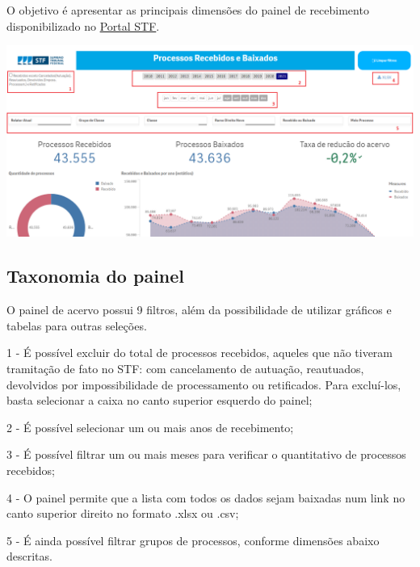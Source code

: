 \documentclass[
]{book}
\begin{document}
O objetivo é apresentar as principais dimensões do painel de recebimento disponibilizado no \href{https://transparencia.stf.jus.br/single/?appid=b282ea92-29ef-4eeb-9676-2b9615ddfabd\&sheet=ef87c134-e282-47ac-8f8f-813754f74e76}{Portal STF}.

\includegraphics[width=1\linewidth]{imagens/fig-cap5-1}

\hypertarget{taxonomia-do-painel-1}{%
\subsection{Taxonomia do painel}\label{taxonomia-do-painel-1}}

O painel de acervo possui 9 filtros, além da possibilidade de utilizar gráficos e tabelas para outras seleções.

1 - É possível excluir do total de processos recebidos, aqueles que não tiveram tramitação de fato no STF: com cancelamento de autuação, reautuados, devolvidos por impossibilidade de processamento ou retificados. Para excluí-los, basta selecionar a caixa no canto superior esquerdo do painel;

2 - É possível selecionar um ou mais anos de recebimento;

3 - É possível filtrar um ou mais meses para verificar o quantitativo de processos recebidos;

4 - O painel permite que a lista com todos os dados sejam baixadas num link no canto superior direito no formato .xlsx ou .csv;

5 - É ainda possível filtrar grupos de processos, conforme dimensões abaixo descritas.
\end{document}
